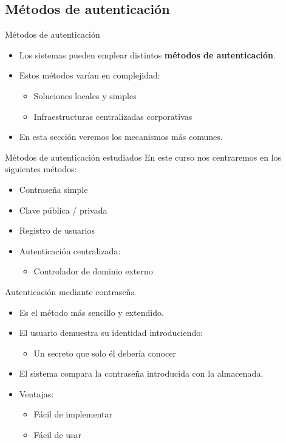\documentclass{beamer}
\begin{document}
\subsection{Métodos de autenticación}

\begin{frame}{Métodos de autenticación}
\begin{itemize}
  \item Los sistemas pueden emplear distintos \textbf{métodos de autenticación}.
  \item Estos métodos varían en complejidad:
  \begin{itemize}
    \item Soluciones locales y simples
    \item Infraestructuras centralizadas corporativas
  \end{itemize}
  \item En esta sección veremos los mecanismos más comunes.
\end{itemize}
\end{frame}

\begin{frame}{Métodos de autenticación estudiados}
En este curso nos centraremos en los siguientes métodos:
\begin{itemize}
  \item Contraseña simple
  \item Clave pública / privada
  \item Registro de usuarios
  \item Autenticación centralizada:
  \begin{itemize}
    \item Controlador de dominio externo
  \end{itemize}
\end{itemize}
\end{frame}

\begin{frame}{Autenticación mediante contraseña}
\begin{itemize}
  \item Es el método más sencillo y extendido.
  \item El usuario demuestra su identidad introduciendo:
  \begin{itemize}
    \item Un secreto que solo él debería conocer
  \end{itemize}
  \item El sistema compara la contraseña introducida con la almacenada.
  \item Ventajas:
  \begin{itemize}
    \item Fácil de implementar
    \item Fácil de usar
  \end{itemize}
\end{itemize}
\end{frame}
\end{document}
